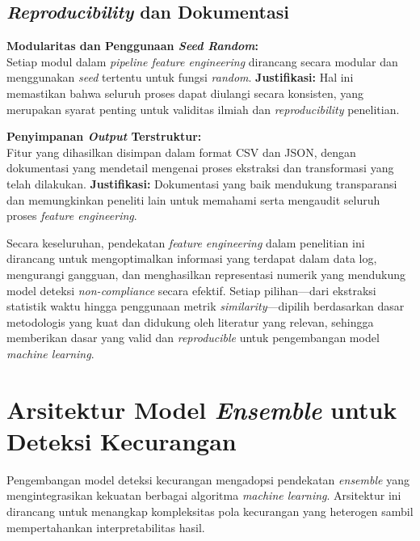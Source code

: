 \subsection{\textit{Reproducibility} dan Dokumentasi}
\label{sec:reproducibilityDokumentasi}
\textbf{Modularitas dan Penggunaan \textit{Seed Random}:} \\
Setiap modul dalam \textit{pipeline feature engineering} dirancang secara modular dan menggunakan \textit{seed} tertentu untuk fungsi \textit{random}.
\textbf{Justifikasi:} Hal ini memastikan bahwa seluruh proses dapat diulangi secara konsisten, yang merupakan syarat penting untuk validitas ilmiah dan \textit{reproducibility} penelitian.

\textbf{Penyimpanan \textit{Output} Terstruktur:} \\
Fitur yang dihasilkan disimpan dalam format CSV dan JSON, dengan dokumentasi yang mendetail mengenai proses ekstraksi dan transformasi yang telah dilakukan.
\textbf{Justifikasi:} Dokumentasi yang baik mendukung transparansi dan memungkinkan peneliti lain untuk memahami serta mengaudit seluruh proses \textit{feature engineering}.

Secara keseluruhan, pendekatan \textit{feature engineering} dalam penelitian ini dirancang untuk mengoptimalkan informasi yang terdapat dalam data log, mengurangi gangguan, dan menghasilkan representasi numerik yang mendukung model deteksi \textit{non-compliance} secara efektif. Setiap pilihan---dari ekstraksi statistik waktu hingga penggunaan metrik \textit{similarity}---dipilih berdasarkan dasar metodologis yang kuat dan didukung oleh literatur yang relevan, sehingga memberikan dasar yang valid dan \textit{reproducible} untuk pengembangan model \textit{machine learning}.


\section{Arsitektur Model \textit{Ensemble} untuk Deteksi Kecurangan}
\label{sec:arsitekturModelEnsemble}

Pengembangan model deteksi kecurangan mengadopsi pendekatan \textit{ensemble} yang mengintegrasikan kekuatan berbagai algoritma \textit{machine learning}. Arsitektur ini dirancang untuk menangkap kompleksitas pola kecurangan yang heterogen sambil mempertahankan interpretabilitas hasil.

